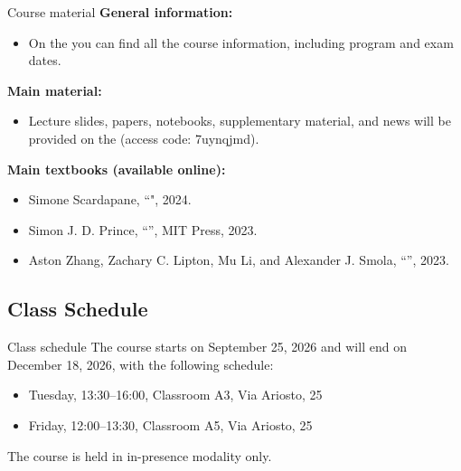 \documentclass[xcolor=x11names,compress,10pt,unknownkeysallowed,aspectratio=169]{beamer}
\begin{document}
\begin{frame}{Course material}
\alert{\textbf{General information:}}
%
\begin{itemize}\justifying
		\item {\small{On the  you can find all the course information, including program and exam dates.}}
\end{itemize}

\vspace{0.4cm}
\alert{\textbf{Main material:}}
\begin{itemize}\justifying
	\item {\small{Lecture slides, papers, notebooks, supplementary material, and news will be provided on the  (access code: 7uynqjmd).}}
\end{itemize}

%
\vspace{0.4cm}
%
\alert{\textbf{Main textbooks (available online):}}
%
\begin{itemize}\justifying
            \item {\small{Simone Scardapane, ``", 2024.}}
		\item {\small{Simon J. D. Prince, ``'', MIT Press, 2023.}}
		\item {\small{Aston Zhang, Zachary C. Lipton, Mu Li, and Alexander J. Smola, ``'', 2023.}}
\end{itemize}
\end{frame}
%
\subsection{Class Schedule}
\begin{frame}{Class schedule}
The course starts on \alert{September 25, 2026} and will end on \alert{December 18, 2026}, with the following schedule:
%
\vspace{0.2cm}
\begin{itemize}\justifying
    \item Tuesday, 13:30--16:00, Classroom A3, Via Ariosto, 25
    \item Friday, 12:00--13:30, Classroom A5, Via Ariosto, 25
\end{itemize}

\vspace{0.5cm}
The course is held in \alert{in-presence modality} only.
\end{frame}
%
\end{document}
